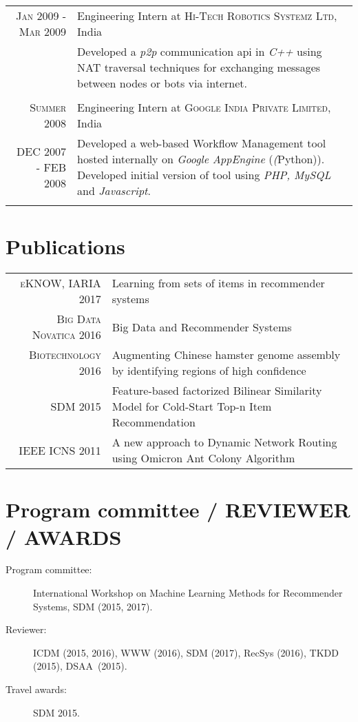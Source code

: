 \documentclass[a4paper,10pt]{article}
\begin{document}
\begin{tabular}{r|p{11cm}}
  \textsc{Jan 2009 - Mar 2009} & Engineering Intern at \textsc{Hi-Tech Robotics
                 Systemz Ltd}, India \\
                 &\footnotesize{ Developed a \emph{p2p} communication api in
                 \emph{C++}
                 using NAT traversal techniques for exchanging messages between
               nodes or bots via internet.} \\\multicolumn{2}{c}{} \\

  \textsc{Summer 2008} & Engineering Intern at \textsc{Google India Private
             Limited}, India \\
             DEC 2007 - FEB 2008  &\footnotesize{ Developed a web-based Workflow Management
           tool hosted internally on \emph{Google AppEngine} (\emph(Python)).
       Developed initial version of tool using \emph{PHP, MySQL} and \emph{
     Javascript}.} \\\multicolumn{2}{c}{} \\
  
\end{tabular}

\section{Publications}
\begin{tabular}{rp{11cm}}
  \textsc{eKNOW, IARIA} 2017 & Learning from sets of items in recommender systems \\
  \textsc{Big Data Novatica} 2016 & Big Data and Recommender Systems \\
  \textsc{Biotechnology} 2016 & Augmenting Chinese hamster genome
  assembly by identifying regions of high confidence \\
 \textsc{SDM} 2015 & Feature-based factorized Bilinear Similarity Model for
  Cold-Start Top-n Item Recommendation
  \\
 \textsc{IEEE ICNS} 2011 & A new approach to Dynamic Network Routing using Omicron
  Ant Colony Algorithm\\
\end{tabular}

\section{Program committee / REVIEWER / AWARDS}
\begin{description}
  \item[Program committee: ] International Workshop on Machine Learning Methods
    for Recommender Systems, SDM (2015, 2017).
  \item[Reviewer: ] ICDM (2015, 2016), WWW (2016), SDM (2017), RecSys (2016),
    TKDD (2015), DSAA~(2015).
  \item[Travel awards: ] SDM 2015.
\end{description}
\end{document}

